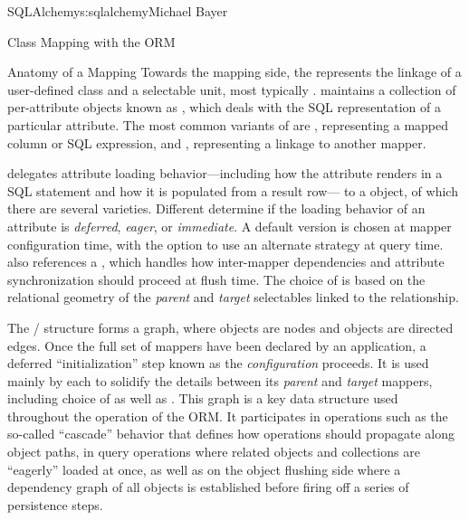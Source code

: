 \begin{aosachapter}{SQLAlchemy}{s:sqlalchemy}{Michael Bayer}
\begin{aosasect1}{Class Mapping with the ORM}
\begin{aosasect2}{Anatomy of a Mapping}
Towards the mapping side, the  represents the linkage of a user-defined class and a selectable unit,
most typically .    maintains a collection
of per-attribute objects known as , which deals with the SQL
representation of a particular attribute.  The most common variants of  are , representing
a mapped column or SQL expression, and , representing a linkage to another mapper.

 delegates attribute loading behavior---including
how the attribute renders in a SQL statement and how it is populated from a result row---
to a  object, of which
there are several varieties.   Different  determine if the loading behavior of
an attribute is \emph{deferred}, \emph{eager}, or \emph{immediate}.  A default version is chosen at mapper
configuration time, with the option to use an alternate strategy at query time.
 also references a ,
which handles how inter-mapper dependencies and attribute synchronization should proceed at flush time.
The choice of  is based on the relational geometry of the \emph{parent} and \emph{target}
selectables linked to the relationship.

The / structure forms a graph, where  objects are nodes and
 objects are directed edges. Once the full set of
mappers have been declared by an application, a deferred ``initialization'' step
known as the \emph{configuration} proceeds. It is used mainly by each
 to solidify the details between its \emph{parent} and
\emph{target} mappers, including choice of  as well as .
This graph is a key data structure used
throughout the operation of the ORM.  It participates in operations such as the
so-called ``cascade'' behavior that defines how operations should propagate
along object paths, in query operations where related objects and collections
are ``eagerly'' loaded at once, as well as on the object flushing side where a
dependency graph of all objects is established before firing off a series of
persistence steps.

\end{aosasect2}

\end{aosasect1}


\end{aosachapter}
